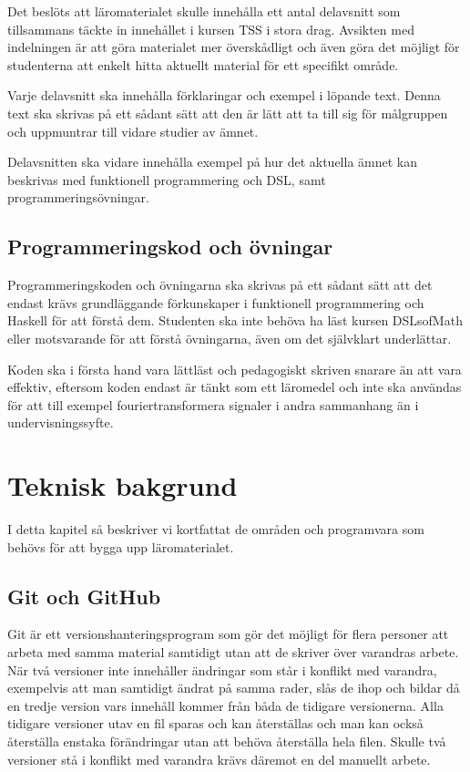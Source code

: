 \documentclass[12pt,a4paper,twoside,openright]{article}
\begin{document}
Det beslöts att läromaterialet skulle innehålla ett antal delavsnitt
som tillsammans täckte in innehållet i kursen TSS i stora drag.
Avsikten med indelningen är att göra materialet mer överskådligt och
även göra det möjligt för studenterna att enkelt hitta aktuellt
material för ett specifikt område.

Varje delavsnitt ska innehålla förklaringar och exempel i löpande text.
Denna text ska skrivas på ett sådant sätt att den är lätt att ta till
sig för målgruppen och uppmuntrar till vidare studier av ämnet.

Delavsnitten ska vidare innehålla exempel på hur det aktuella ämnet kan
beskrivas med funktionell programmering och DSL, samt programmeringsövningar.

\subsection{Programmeringskod och övningar}

Programmeringskoden och övningarna ska skrivas på ett sådant sätt att
det endast krävs grundläggande förkunskaper i funktionell
programmering och Haskell för att förstå dem. Studenten ska inte
behöva ha läst kursen DSLsofMath eller motsvarande för att förstå
övningarna, även om det självklart underlättar.

Koden ska i första hand vara lättläst och pedagogiskt skriven snarare
än att vara effektiv, eftersom koden endast är tänkt som ett läromedel
och inte ska användas för att till exempel fouriertransformera
signaler i andra sammanhang än i undervisningssyfte.

\section{Teknisk bakgrund}
I detta kapitel så beskriver vi kortfattat de områden och programvara som
behövs för att bygga upp läromaterialet.

\subsection{Git och GitHub}
Git är ett versionshanteringsprogram som gör det möjligt för flera
personer att arbeta med samma material samtidigt utan att de skriver
över varandras arbete. När två versioner inte innehåller
ändringar som står i konflikt med varandra, exempelvis att man
samtidigt ändrat på samma rader, slås de ihop och bildar då en tredje
version vars innehåll kommer från båda de tidigare versionerna. Alla
tidigare versioner utav en fil sparas och kan återställas och man kan
också återställa enstaka förändringar utan att behöva återställa hela
filen. Skulle två versioner stå i konflikt med varandra krävs däremot
en del manuellt arbete.
\end{document}
